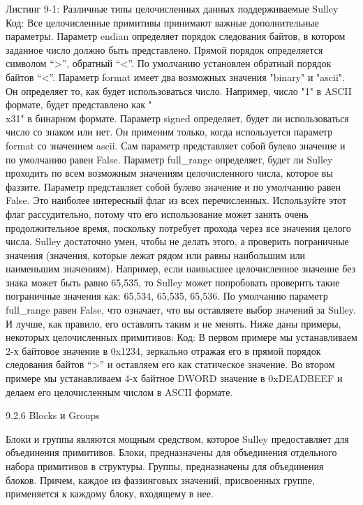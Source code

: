 \documentclass[12pt]{book}
\begin{document}
Листинг 9-1: Различные типы целочисленных данных поддерживаемые Sulley
Код:
Все целочисленные примитивы принимают важные дополнительные параметры.
Параметр endian определяет порядок следования байтов, в котором заданное число должно быть представлено. Прямой порядок определяется символом ``>'', обратный ``<''. По умолчанию установлен обратный порядок байтов ``<''.
Параметр format имеет два возможных значения "binary" и "ascii". Он определяет то, как будет использоваться число. Например, число "1" в ASCII формате, будет представлено как "\\x31" в бинарном формате.
Параметр signed определяет, будет ли использоваться число со знаком или нет. Он применим только, когда используется параметр format со значением ascii. Сам параметр представляет собой булево значение и по умолчанию равен False.
Параметр full\_range определяет, будет ли Sulley проходить по всем возможным значениям целочисленного числа, которое вы фаззите. Параметр представляет собой булево значение и по умолчанию равен False. Это наиболее интересный флаг из всех перечисленных. Используйте этот флаг рассудительно, потому что его использование может занять очень продолжительное время, поскольку потребует прохода через все значения целого числа. Sulley достаточно умен, чтобы не делать этого, а проверить пограничные значения (значения, которые лежат рядом или равны наибольшим или наименьшим значениям). Например, если наивысшее целочисленное значение без знака может быть равно 65,535, то Sulley может попробовать проверить такие пограничные значения как: 65,534, 65,535, 65,536. По умолчанию параметр full\_range равен False, что означает, что вы оставляете выбор значений за Sulley. И лучше, как правило, его оставлять таким и не менять.
Ниже даны примеры, некоторых целочисленных примитивов:
Код:
В первом примере мы устанавливаем 2-х байтовое значение в 0x1234, зеркально отражая его в прямой порядок следования байтов ``>'' и оставляем его как статическое значение. Во втором примере мы устанавливаем 4-х байтное DWORD значение в 0xDEADBEEF и делаем его целочисленным числом в ASCII формате.

9.2.6 Blocks и Groups

Блоки и группы являются мощным средством, которое Sulley предоставляет для объединения примитивов. Блоки, предназначены для объединения отдельного набора примитивов в структуры. Группы, предназначены для объединения блоков. Причем, каждое из фаззинговых значений, присвоенных группе, применяется к каждому блоку, входящему в нее. 
\end{document}
